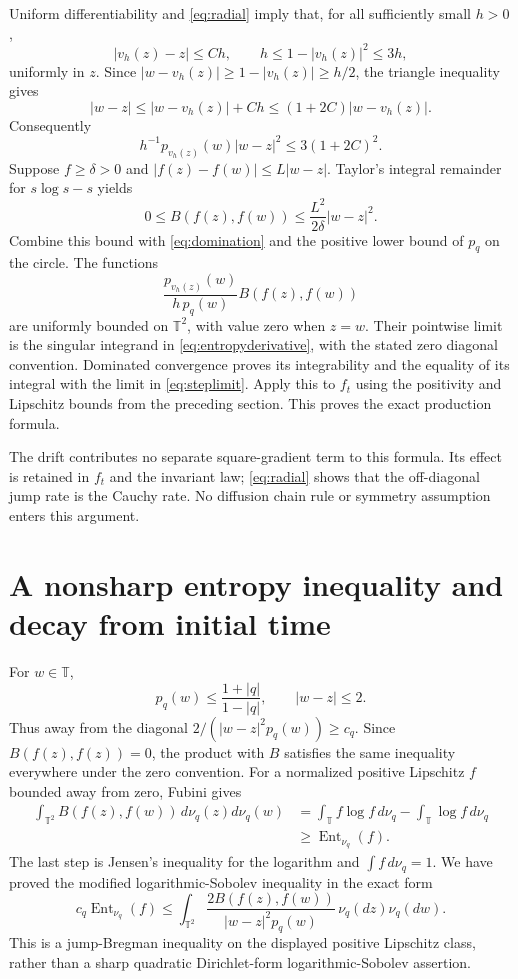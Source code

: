 \documentclass[11pt]{article}
\newcommand{\T}{\mathbb T}\newcommand{\D}{\mathbb D}
\newcommand{\Ent}{\operatorname{Ent}}
\begin{document}
Uniform differentiability and \eqref{eq:radial} imply
that, for all sufficiently small $h>0$,
\[
 |v_h(z)-z|\leq C h,\qquad
 h\leq1-|v_h(z)|^2\leq3h,
\]
uniformly in $z$. Since $|w-v_h(z)|\geq1-|v_h(z)|\geq h/2$,
the triangle inequality gives
\[
 |w-z|\leq|w-v_h(z)|+Ch
       \leq(1+2C)|w-v_h(z)|.
\]
Consequently
\begin{equation}\label{eq:domination}
 h^{-1}p_{v_h(z)}(w)|w-z|^2\leq3(1+2C)^2.
\end{equation}
Suppose $f\geq\delta>0$ and
$|f(z)-f(w)|\leq L|w-z|$. Taylor's integral remainder
for $s\log s-s$ yields
\[
 0\leq B(f(z),f(w))\leq\frac{L^2}{2\delta}|w-z|^2.
\]
Combine this bound with \eqref{eq:domination} and the
positive lower bound of $p_q$ on the circle.
The functions
\[
 \frac{p_{v_h(z)}(w)}{h\,p_q(w)}B(f(z),f(w))
\]
are uniformly bounded on $\T^2$, with value zero when
$z=w$. Their pointwise limit is the singular integrand
in \eqref{eq:entropyderivative}, with the stated zero
diagonal convention. Dominated convergence proves its
integrability and the equality of its integral with the
limit in \eqref{eq:steplimit}. Apply this to $f_t$ using
the positivity and Lipschitz bounds from the preceding
section. This proves the exact production formula.

The drift contributes no separate square-gradient term
to this formula. Its effect is retained in $f_t$ and
the invariant law; \eqref{eq:radial} shows that the
off-diagonal jump rate is the Cauchy rate. No diffusion
chain rule or symmetry assumption enters this argument.

\section{A nonsharp entropy inequality and decay from initial time}
For $w\in\T$,
\[
 p_q(w)\leq\frac{1+|q|}{1-|q|},\qquad |w-z|\leq2.
\]
Thus away from the diagonal
$2/(|w-z|^2p_q(w))\geq c_q$.
Since $B(f(z),f(z))=0$, the product with $B$ satisfies
the same inequality everywhere under the zero convention.
For a normalized positive Lipschitz $f$ bounded away
from zero, Fubini gives
\begin{align*}
 \int_{\T^2}B(f(z),f(w))\,d\nu_q(z)d\nu_q(w)
 &=\int_\T f\log f\,d\nu_q-\int_\T\log f\,d\nu_q\\
 &\geq\Ent_{\nu_q}(f).
\end{align*}
The last step is Jensen's inequality for the logarithm
and $\int f\,d\nu_q=1$. We have proved the modified
logarithmic-Sobolev inequality in the exact form
\begin{equation}\label{eq:mlsi}
 c_q\Ent_{\nu_q}(f)
 \leq\int_{\T^2}\frac{2B(f(z),f(w))}{|w-z|^2p_q(w)}
            \,\nu_q(dz)\nu_q(dw).
\end{equation}
This is a jump-Bregman inequality on the displayed
positive Lipschitz class, rather than a sharp quadratic
Dirichlet-form logarithmic-Sobolev assertion.
\end{document}
